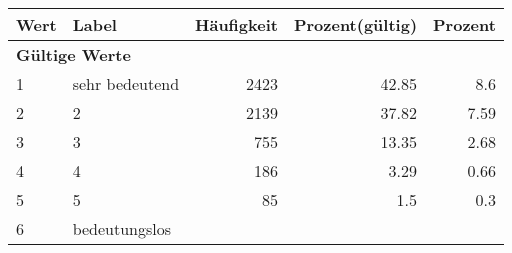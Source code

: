      \begin{longtable}{lXrrr}
     \toprule
     \textbf{Wert} & \textbf{Label} & \textbf{Häufigkeit} & \textbf{Prozent(gültig)} & \textbf{Prozent} \\
     \endhead
     \midrule
     \multicolumn{5}{l}{\textbf{Gültige Werte}}\\

     1 &
     \multicolumn{1}{X}{ sehr bedeutend   } &


       \num{2423} &
       \num[round-mode=places,round-precision=2]{42.85} &
         \num[round-mode=places,round-precision=2]{8.6} \\

     2 &
     \multicolumn{1}{X}{ 2   } &


       \num{2139} &
       \num[round-mode=places,round-precision=2]{37.82} &
         \num[round-mode=places,round-precision=2]{7.59} \\

     3 &
     \multicolumn{1}{X}{ 3   } &


       \num{755} &
       \num[round-mode=places,round-precision=2]{13.35} &
         \num[round-mode=places,round-precision=2]{2.68} \\

     4 &
     \multicolumn{1}{X}{ 4   } &


       \num{186} &
       \num[round-mode=places,round-precision=2]{3.29} &
         \num[round-mode=places,round-precision=2]{0.66} \\

     5 &
     \multicolumn{1}{X}{ 5   } &


       \num{85} &
       \num[round-mode=places,round-precision=2]{1.5} &
         \num[round-mode=places,round-precision=2]{0.3} \\

     6 &
     \multicolumn{1}{X}{ bedeutungslos   } &



\end{longtable}
